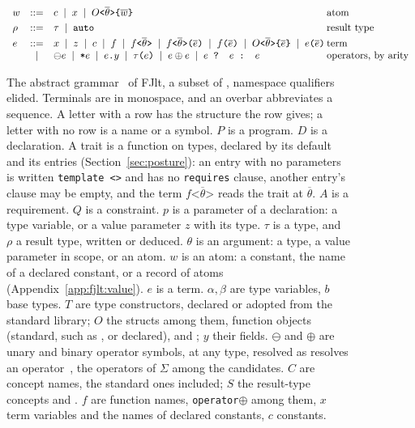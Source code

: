 \begin{figure}[!htb]
\[\begin{array}{lcl@{\hspace{0.2em}}l}
w &::=& c \;\mid\; x \;\mid\; O\texttt{<}\overline{\theta}\texttt{>\{}\overline{w}\texttt{\}} & \text{atom} \\[3pt]
\rho &::=& \tau \;\mid\; \texttt{auto} & \text{result type} \\[3pt]
e &::=& x \;\mid\; z \;\mid\; c \;\mid\; f \;\mid\; f\texttt{<}\overline{\theta}\texttt{>} \;\mid\; f\texttt{<}\overline{\theta}\texttt{>(}\overline{e}\texttt{)} \;\mid\; f\texttt{(}\overline{e}\texttt{)} \;\mid\; O\texttt{<}\overline{\theta}\texttt{>\{}\overline{e}\texttt{\}} \;\mid\; e\texttt{(}\overline{e}\texttt{)} & \text{term} \\
  & \mid & \ominus e \;\mid\; \texttt{*}e \;\mid\; e\texttt{.}y \;\mid\; \tau\texttt{(}e\texttt{)} \;\mid\; e \oplus e \;\mid\; e \texttt{ ? } e \texttt{ : } e & \text{operators, by arity} \\
\end{array}
\]
\caption{The abstract grammar~\cite{pierce2002tapl} of FJlt, a subset of , namespace qualifiers elided.
Terminals are in monospace, and an overbar abbreviates a sequence.
A letter with a row has the structure the row gives; a letter with no row is a name or a symbol.
$P$ is a program.
$D$ is a declaration.
A trait is a function on types, declared by its default and its entries (Section~\ref{sec:posture}): an entry with no parameters is written \texttt{template <>} and has no \texttt{requires} clause, another entry's clause may be empty, and the term $f\texttt{<}\overline{\theta}\texttt{>}$ reads the trait at $\overline{\theta}$.
$A$ is a requirement.
$Q$ is a constraint.
$p$ is a parameter of a declaration: a type variable, or a value parameter $z$ with its type.
$\tau$ is a type, and $\rho$ a result type, written or deduced.
$\theta$ is an argument: a type, a value parameter in scope, or an atom.
$w$ is an atom: a constant, the name of a declared constant, or a record of atoms (Appendix~\ref{app:fjlt:value}).
$e$ is a term.
$\alpha, \beta$ are type variables, $b$ base types.
$T$ are type constructors, declared or adopted from the standard library; $O$ the structs among them, function objects (standard, such as , or declared),  and ; $y$ their fields.
$\ominus$ and $\oplus$ are unary and binary operator symbols, at any type, resolved as \Cpp{} resolves an operator~\cite[{\texttt{over.match.oper}}]{cpp23standard}, the operators of $\Sigma$ among the candidates.
$C$ are concept names, the standard ones included; $S$ the result-type concepts  and .
$f$ are function names, \texttt{operator}$\oplus$ among them, $x$ term variables and the names of declared constants, $c$ constants.}
\label{fig:fjlt-syntax}
\end{figure}

